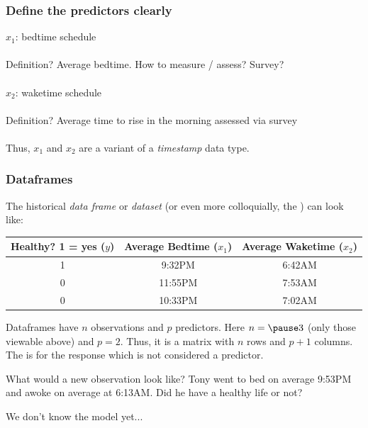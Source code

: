 \documentclass[slides]{beamer} %
\begin{document}
\begin{frame}\frametitle{Define the predictors clearly}

$x_1$: bedtime schedule \\~\\

Definition? \pause Average bedtime. \pause How to measure / assess? Survey? \\~\\	



$x_2$: waketime schedule \\~\\	

Definition? \pause Average time to rise in the morning assessed via survey\\~\\	

Thus, $x_1$ and $x_2$ are a variant of a \textit{timestamp} data type.

\end{frame}

\begin{frame}\frametitle{Dataframes}

\small
The historical \textit{data frame} or \textit{dataset} (or even more colloquially, the ) can look like:

\begin{table}
\centering
\small
\begin{tabular}{ccc}
Healthy? 1 = yes ($y$) & Average Bedtime ($x_1$) & Average Waketime ($x_2$) \\ \hline
1 & 9:32PM & 6:42AM \\
0 & 11:55PM & 7:53AM \\
0 & 10:33PM & 7:02AM
\end{tabular}
\end{table} \pause 

Dataframes have $n$ observations and $p$ predictors. Here $n = \pause 3$ (only those viewable above) and $p = 2$. Thus, it is a matrix with $n$ rows and $p + 1$ columns. The  is for the response which is not considered a predictor. \\ \pause 

What would a new observation look like? Tony went to bed on average 9:53PM and awoke on average at 6:13AM. Did he have a healthy life or not? \pause 

We don't know the model yet...
	
\end{frame}
\end{document}
